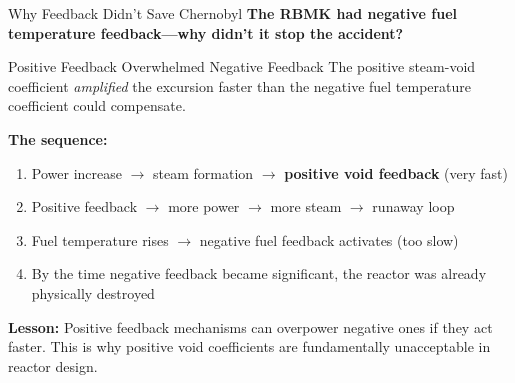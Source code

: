 \documentclass[aspectratio=169]{beamer}
\begin{document}
\begin{frame}[allowframebreaks]{Why Feedback Didn't Save Chernobyl}
    \textbf{The RBMK had negative fuel temperature feedback—why didn't it stop the accident?}

    \vspace{1em}
    \begin{alertblock}{Positive Feedback Overwhelmed Negative Feedback}
        The positive steam-void coefficient \textit{amplified} the excursion faster than the negative fuel temperature coefficient could compensate.
        
        \vspace{0.5em}
        \textbf{The sequence:}
        \begin{enumerate}
            \item Power increase $\rightarrow$ steam formation $\rightarrow$ \textbf{positive void feedback} (very fast)
            \item Positive feedback $\rightarrow$ more power $\rightarrow$ more steam $\rightarrow$ runaway loop
            \item Fuel temperature rises $\rightarrow$ negative fuel feedback activates (too slow)
            \item By the time negative feedback became significant, the reactor was already physically destroyed
        \end{enumerate}
    \end{alertblock}

    \vspace{1em}
    \textbf{Lesson:} Positive feedback mechanisms can overpower negative ones if they act faster. This is why positive void coefficients are fundamentally unacceptable in reactor design.
\end{frame}
\end{document}
